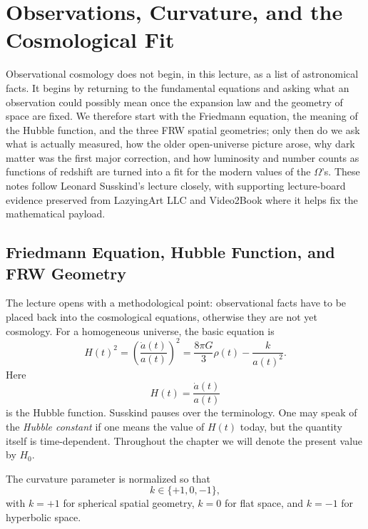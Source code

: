 \chapter{Observations, Curvature, and the Cosmological Fit}

Observational cosmology does not begin, in this lecture, as a list of astronomical facts. It begins by returning to the fundamental equations and asking what an observation could possibly mean once the expansion law and the geometry of space are fixed. We therefore start with the Friedmann equation, the meaning of the Hubble function, and the three FRW spatial geometries; only then do we ask what is actually measured, how the older open-universe picture arose, why dark matter was the first major correction, and how luminosity and number counts as functions of redshift are turned into a fit for the modern values of the \(\Omega\)'s. These notes follow Leonard Susskind's lecture closely, with supporting lecture-board evidence preserved from LazyingArt LLC and Video2Book where it helps fix the mathematical payload.

\section{Friedmann Equation, Hubble Function, and FRW Geometry}

The lecture opens with a methodological point: observational facts have to be placed back into the cosmological equations, otherwise they are not yet cosmology. For a homogeneous universe, the basic equation is
\begin{equation}
H(t)^2
=
\left(\frac{\dot a(t)}{a(t)}\right)^2
=
\frac{8\pi G}{3}\rho(t)-\frac{k}{a(t)^2}.
\end{equation}
Here
\begin{equation}
H(t)=\frac{\dot a(t)}{a(t)}
\end{equation}
is the Hubble function. Susskind pauses over the terminology. One may speak of the \emph{Hubble constant} if one means the value of \(H(t)\) today, but the quantity itself is time-dependent. Throughout the chapter we will denote the present value by \(H_0\).

The curvature parameter is normalized so that
\begin{equation}
k\in\{+1,0,-1\},
\end{equation}
with \(k=+1\) for spherical spatial geometry, \(k=0\) for flat space, and \(k=-1\) for hyperbolic space.

